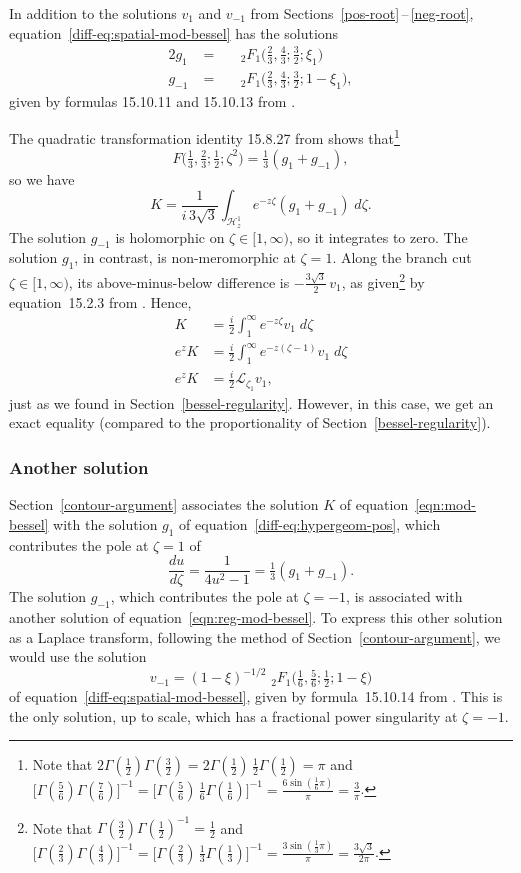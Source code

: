 \documentclass{article}
\newcommand{\laplace}{\mathcal{L}}
\theoremstyle{definition}
\theoremstyle{plain}
\begin{document}
In addition to the solutions $v_1$ and $v_{-1}$ from Sections~\ref{pos-root}\,--\,\ref{neg-root}, equation~\eqref{diff-eq:spatial-mod-bessel} has the solutions
\begin{alignat*}{2}
g_1 &\;=\;& & {}_2F_1\big(\tfrac{2}{3}, \tfrac{4}{3}; \tfrac{3}{2}; \xi_1\big) \\
g_{-1} &\;=\;&  & {}_2F_1\big(\tfrac{2}{3}, \tfrac{4}{3}; \tfrac{3}{2}; 1-\xi_1\big),
\end{alignat*}
given by formulas 15.10.11 and 15.10.13 from \cite{dlmf}.

The quadratic transformation identity 15.8.27 from \cite{dlmf} shows that\footnote{Note that $2\Gamma(\tfrac{1}{2})\Gamma(\tfrac{3}{2}) = 2\Gamma(\tfrac{1}{2})\,\tfrac{1}{2}\Gamma(\tfrac{1}{2}) = \pi$ and $\big[\Gamma(\tfrac{5}{6})\Gamma(\tfrac{7}{6})\big]^{-1} = \big[\Gamma(\tfrac{5}{6})\,\tfrac{1}{6}\Gamma(\tfrac{1}{6})\big]^{-1} = \frac{6\sin(\tfrac{1}{6} \pi)}{\pi} = \frac{3}{\pi}$.}
\[ F\big(\tfrac{1}{3}, \tfrac{2}{3}; \tfrac{1}{2}; \zeta^2\big) = \tfrac{1}{3}(g_1 + g_{-1}), \]
so we have
\[ K = \frac{1}{i\,3\sqrt{3}} \int_{\mathcal{H}^1_z} e^{-z\zeta} (g_1 + g_{-1})\;d\zeta. \]
The solution $g_{-1}$ is holomorphic on $\zeta \in [1, \infty)$, so it integrates to zero. The solution $g_1$, in contrast, is non-meromorphic at $\zeta = 1$. Along the branch cut $\zeta \in [1, \infty)$, its above-minus-below difference is $-\tfrac{3\sqrt{3}}{2}\,v_1$,
as given\footnote{Note that $\Gamma(\tfrac{3}{2}) \Gamma(\tfrac{1}{2})^{-1} = \tfrac{1}{2}$ and $\big[\Gamma(\tfrac{2}{3})\Gamma(\tfrac{4}{3})\big]^{-1} = \big[\Gamma(\tfrac{2}{3})\,\tfrac{1}{3}\Gamma(\tfrac{1}{3})\big]^{-1} = \frac{3\sin(\tfrac{1}{3} \pi)}{\pi} = \frac{3\sqrt{3}}{2\pi}$.} by equation~15.2.3 from \cite{dlmf}.
Hence,
\begin{align*}
K & = \frac{i}{2} \int^\infty_1 e^{-z\zeta} v_1\;d\zeta \\
e^z K & = \frac{i}{2} \int^\infty_1 e^{-z(\zeta - 1)} v_1\;d\zeta \\
e^z K & = \tfrac{i}{2} \laplace_{\zeta_1} v_1,
\end{align*}
just as we found in Section~\ref{bessel-regularity}. However, in this case, we get an exact equality (compared to the proportionality of Section~\ref{bessel-regularity}). 
\subsubsection{Another solution}
Section~\ref{contour-argument} associates the solution $K$ of equation~\eqref{eqn:mod-bessel} with the solution $g_1$ of equation~\eqref{diff-eq:hypergeom-pos}, which contributes the pole at $\zeta = 1$ of
\[ \frac{du}{d\zeta} = \frac{1}{4u^2 - 1} = \tfrac{1}{3}(g_1 + g_{-1}). \]
The solution $g_{-1}$, which contributes the pole at $\zeta = -1$, is associated with another solution of equation~\eqref{eqn:reg-mod-bessel}.
To express this other solution as a Laplace transform, following the method of Section~\ref{contour-argument}, we would use the solution
\[ v_{-1} = (1-\xi)^{-1/2} \,\, {}_2F_1\big(\tfrac{1}{6}, \tfrac{5}{6}; \tfrac{1}{2}; 1-\xi\big) \]
of equation~\eqref{diff-eq:spatial-mod-bessel}, given by formula~15.10.14 from \cite{dlmf}. This is the only solution, up to scale, which has a fractional power singularity at $\zeta = -1$.
\end{document}
